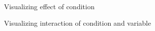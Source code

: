 \documentclass{article}
\begin{document}
\begin{figure}[H]
  \caption{Visualizing effect of condition}
  \noindent{}
  \centering
\end{figure}

\begin{figure}[H]
  \caption{Visualizing interaction of condition and variable}
  \noindent{}
  \centering
\end{figure}
\end{document}
